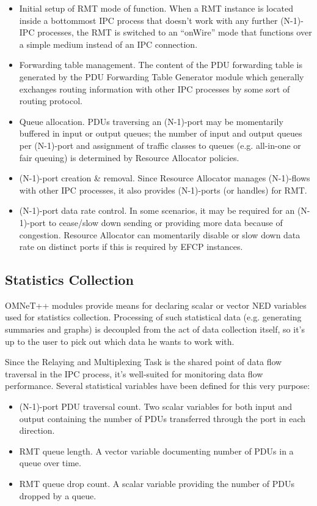             \begin{itemize}
                \item Initial setup of RMT mode of function. When a RMT instance is located inside a bottommost IPC process that doesn't work with any further (N-1)-IPC processes, the RMT is switched to an ``onWire'' mode that functions over a simple medium instead of an IPC connection.
                \item Forwarding table management. The content of the PDU forwarding table is generated by the PDU Forwarding Table Generator module which generally exchanges routing information with other IPC processes by some sort of routing protocol.
                \item Queue allocation. PDUs traversing an (N-1)-port may be momentarily buffered in input or output queues; the number of input and output queues per (N-1)-port and assignment of traffic classes to queues (e.g. all-in-one or fair queuing) is determined by Resource Allocator policies.
                \item (N-1)-port creation \& removal. Since Resource Allocator manages (N-1)-flows with other IPC processes, it also provides (N-1)-ports (or handles) for RMT.
                \item (N-1)-port data rate control. In some scenarios, it may be required for an (N-1)-port to cease/slow down sending or providing more data because of congestion. Resource Allocator can momentarily disable or slow down data rate on distinct ports if this is required by EFCP instances.
            \end{itemize}

        \subsection{Statistics Collection}
            OMNeT++ modules provide means for declaring scalar or vector NED variables used for statistics collection. Processing of such statistical data (e.g. generating summaries and graphs) is decoupled from the act of data collection itself, so it's up to the user to pick out which data he wants to work with.

            Since the Relaying and Multiplexing Task is the shared point of data flow traversal in the IPC process, it's well-suited for monitoring data flow performance. Several statistical variables have been defined for this very purpose:

            \begin{itemize}
            \item (N-1)-port PDU traversal count. Two scalar variables for both input and output containing the number of PDUs transferred through the port in each direction.
            \item RMT queue length. A vector variable documenting number of PDUs in a queue over time.
            \item RMT queue drop count. A scalar variable providing the number of PDUs dropped by a queue.
            \end{itemize}


